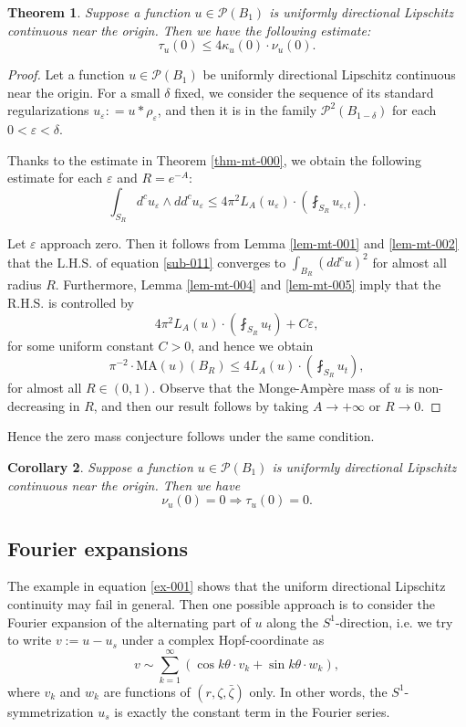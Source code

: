 \documentclass[a4paper,11pt]{amsart}
\numberwithin{equation}{section}
\newtheorem{theorem}{Theorem}[section]
\newtheorem{cor}[theorem]{Corollary}
\def\cP{{\mathcal P}}
\def\cP{{\mathcal P}}
\let\ep=\varepsilon
\def\z{{\zeta}}
\def\k{{\kappa}}
\begin{document}
\begin{theorem}
\label{thm-mt-001}
Suppose a function $u\in\cP(B_1)$ is uniformly directional Lipschitz continuous 
near the origin. 
Then we have the following estimate: 
$$ \tau_u(0) \leq 4 \k_u(0) \cdot \nu_u(0). $$
\end{theorem}
\begin{proof}
Let a function $u\in \cP(B_1)$ be uniformly directional Lipschitz continuous near the origin.  
For a small $\delta$ fixed, 
we consider the sequence of its standard regularizations $u_{\ep}: = u * \rho_{\ep}$, 
and then it is in the family $\cP^{2}(B_{1-\delta})$ for each $0<\ep<\delta$. 

Thanks to the estimate in Theorem \ref{thm-mt-000}, 
we obtain the following estimate for each $\ep$ and $R= e^{-A}$:  
\begin{equation}
\label{sub-011}
\int_{S_R} d^c u_{\ep} \wedge dd^c u_{\ep} 
\leq  4\pi^2 L_A(u_{\ep})\cdot \left( \fint_{S_R} u_{\ep, t} \right).
\end{equation}

Let $\ep$ approach zero.
Then it follows from 
Lemma \ref{lem-mt-001} and \ref{lem-mt-002} 
that the L.H.S. of equation \eqref{sub-011} converges 
to $\int_{B_R}(dd^c u)^2$ for almost all radius $R$.  
Furthermore, 
Lemma \ref{lem-mt-004} and \ref{lem-mt-005} 
imply that the R.H.S. is controlled by 
$$ 4\pi^2 L_A(u) \cdot \left( \fint_{S_R} u_{t} \right) + C\ep, $$
for some uniform constant $C>0$, 
and hence we obtain 
\begin{equation}
\label{sub-012}
\pi^{-2} \cdot \mbox{MA}(u)(B_R) \leq 4 L_A(u) \cdot \left( \fint_{S_R} u_t \right), 
\end{equation}
for almost all $R\in (0,1)$. 
Observe that the Monge-Amp\`ere mass of $u$ is non-decreasing in $R$,
and then our result follows by taking $A\rightarrow +\infty$ or $R\rightarrow 0$. 
 
\end{proof}

Hence the zero mass conjecture follows under the same condition. 

\begin{cor}
\label{cor-mt-001}
Suppose a function $u\in\cP(B_1)$ is uniformly directional Lipschitz continuous near the origin. 
Then we have 
$$ \nu_u(0) =0 \Rightarrow \tau_u(0) =0.  $$
\end{cor}



\subsection{Fourier expansions}
The example in equation \eqref{ex-001} shows that 
the uniform directional Lipschitz continuity may fail in general.  
Then one possible approach 
is to consider the Fourier expansion of the alternating part 
of $u$ along the $S^1$-direction, i.e. we try to write $v:= u-u_s$ 
under a complex Hopf-coordinate as 
$$ v \sim \sum_{k=1}^{\infty} \left( \cos k\theta \cdot v_k  +   \sin k\theta \cdot w_k  \right), $$
where $v_k$ and $w_k$ are functions of $(r, \z, \bar\z)$ only. 
In other words, the $S^1$-symmetrization $u_s$ is exactly the constant term 
in the Fourier series. 
 
\end{document}
